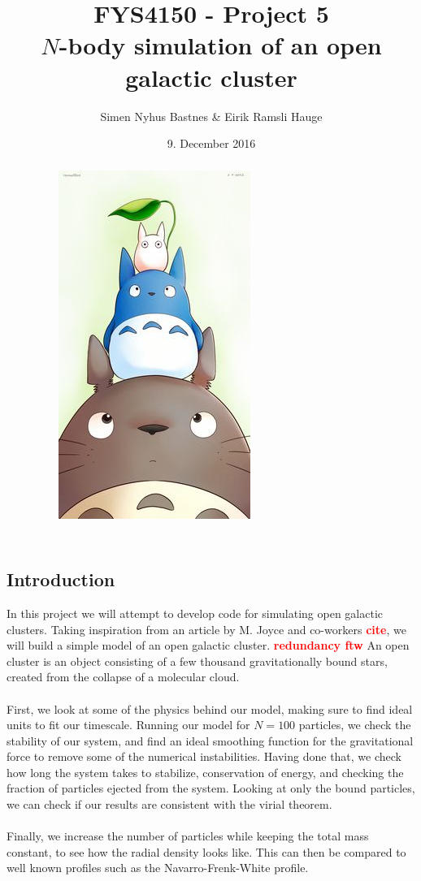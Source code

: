 \documentclass{article}
\title{FYS4150 - Project 5\\$N$-body simulation of an open galactic cluster}
\author{Simen Nyhus Bastnes \& Eirik Ramsli Hauge}
\date{9. December 2016}
\newcommand\red[1]{\textcolor{red}{\textbf{#1}}}
\begin{document}
\maketitle
\begin{abstract}
\begin{figure}[H]
\centering
\includegraphics[scale=0.5]{totoro.jpg}
\end{figure}
\end{abstract}
\subsection{Introduction}
In this project we will attempt to develop code for simulating open galactic clusters. Taking inspiration from an article by M. Joyce and co-workers \red{cite}, we will build a simple model of an open galactic cluster. \red{redundancy ftw} An open cluster is an object consisting of a few thousand gravitationally bound stars, created from the collapse of a molecular cloud.\\\\
First, we look at some of the physics behind our model, making sure to find ideal units to fit our timescale. Running our model for $N = 100$ particles, we check the stability of our system, and find an ideal smoothing function for the gravitational force to remove some of the numerical instabilities. Having done that, we check how long the system takes to stabilize, conservation of energy, and checking the fraction of particles ejected from the system. Looking at only the bound particles, we can check if our results are consistent with the virial theorem.\\\\
Finally, we increase the number of particles while keeping the total mass constant, to see how the radial density looks like. This can then be compared to well known profiles such as the Navarro-Frenk-White profile.
\end{document}
